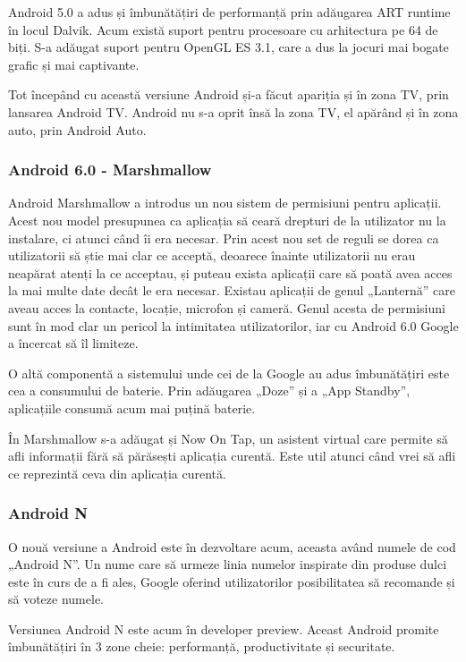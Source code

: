 \documentclass[12pt,a4paper]{article}
\begin{document}
	Android 5.0 a adus și îmbunătățiri de performanță prin adăugarea ART runtime în locul Dalvik. Acum există suport pentru procesoare cu arhitectura pe 64 de biți. S-a adăugat suport pentru OpenGL ES 3.1, care a dus la jocuri mai bogate grafic și mai captivante.
	
	Tot începând cu această versiune Android și-a făcut apariția și în zona TV, prin lansarea Android TV. Android nu s-a oprit însă la zona TV, el apărând și în zona auto, prin Android Auto.

	
\subsubsection{Android 6.0 - Marshmallow}
Android Marshmallow a introdus un nou sistem de permisiuni pentru aplicații. Acest nou model presupunea ca aplicația să ceară drepturi de la utilizator nu la instalare, ci atunci când îi era necesar. Prin acest nou set de reguli se dorea ca utilizatorii să știe mai clar ce acceptă, deoarece înainte utilizatorii nu erau neapărat atenți la ce acceptau, și puteau exista aplicații care să poată avea acces la mai multe date decât le era necesar. Existau aplicații de genul „Lanternă” care aveau acces la contacte, locație, microfon și cameră. Genul acesta de permisiuni sunt în mod clar un pericol la intimitatea utilizatorilor, iar cu Android 6.0 Google a încercat să îl limiteze.

	O altă componentă a sistemului unde cei de la Google au adus îmbunătățiri este cea a consumului de baterie. Prin adăugarea „Doze” și a „App Standby”, aplicațiile consumă acum mai puțină baterie.

	În Marshmallow s-a adăugat și Now On Tap, un asistent virtual care permite să afli informații fără să părăsești aplicația curentă. Este util atunci când vrei să afli ce reprezintă ceva din aplicația curentă.


\subsubsection{Android N}
O nouă versiune a Android este în dezvoltare acum, aceasta având numele de cod „Android N”. Un nume care să urmeze linia numelor inspirate din produse dulci este în curs de a fi ales, Google oferind utilizatorilor posibilitatea să recomande și să voteze numele.
	
	Versiunea Android N este acum în developer preview. Aceast Android promite îmbunătățiri în 3 zone cheie: performanță, productivitate și securitate.
	
\end{document}
